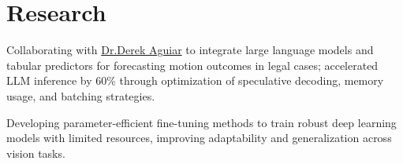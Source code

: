 \documentclass[]{resume-template}
\begin{document}
\begin{minipage}[t]{0.66\textwidth}


  \section{Research}\label{sec:research}

  \begin{tightemize}
  \item Collaborating with
    \href{https://www.derekaguiar.com/}{Dr.Derek Aguiar} to integrate large language models and tabular predictors for forecasting motion outcomes in legal cases; accelerated LLM inference by 60\% through optimization of speculative decoding, memory usage, and batching strategies.

  \item Developing parameter-efficient fine-tuning methods to train robust deep learning models with limited resources, improving adaptability and generalization across vision tasks.

  \end{tightemize}



\end{minipage}
\end{document}
